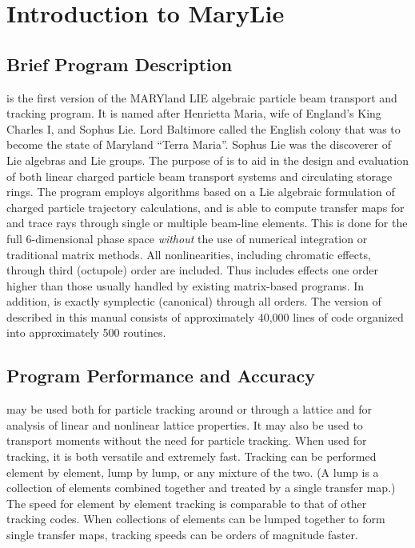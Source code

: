 
\chapter{Introduction to MaryLie}

\section{Brief Program Description}
 is the first version of the MARYland LIE algebraic particle beam
transport and tracking program.  It is named after Henrietta Maria, wife of England's King Charles I, and Sophus Lie.  Lord Baltimore called the English colony that was to become the state of Maryland ``Terra Maria''.  Sophus Lie was the discoverer of Lie algebras and Lie groups.  The purpose of \Mary is to aid in the design
and evaluation of both linear charged particle beam transport systems and
circulating storage rings.  The program employs algorithms based on a Lie
algebraic formulation of charged particle trajectory calculations, and is able to
compute transfer maps for and trace rays through single or multiple beam-line
elements.  This is done for the full 6-dimensional phase space {\em without} the
use of numerical integration or traditional matrix methods.  All nonlinearities,
including chromatic effects, through third (octupole) order are included.  Thus
 includes effects one order higher than those usually handled by existing
matrix-based programs.  In addition, \Mary is exactly symplectic (canonical)
through all orders.  The version of \Mary described in this manual consists of approximately 40,000 lines of code organized into approximately 500 routines.

\section{Program Performance and Accuracy}
\Mary may be used both for particle tracking around or through a lattice and for
analysis of linear and nonlinear lattice properties.  It may also be used
to transport moments without the need for particle tracking.  When used for tracking, it
is both versatile and extremely fast.  Tracking can be performed element by
element, lump by lump, or any mixture of the two.  (A lump is a collection of
elements combined together and treated by a single transfer map.)  The speed for
element by element tracking is comparable to that of other tracking codes.  When
collections of elements can be lumped together to form single transfer maps,
tracking speeds can be orders of magnitude faster.

